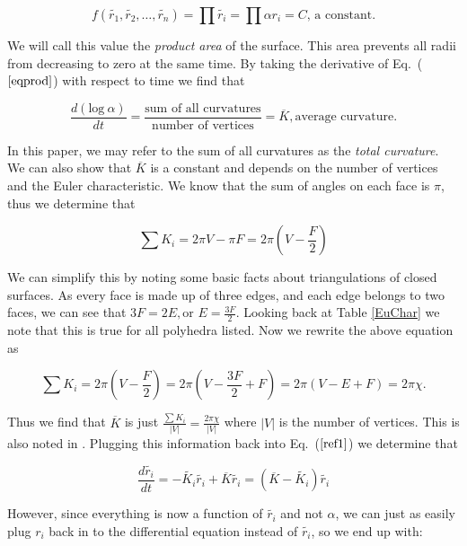 \documentclass[12pt]{article}
\begin{document}
\begin{equation}
\label{eqprod}
f(\tilde{r_1},\tilde{r_2},\ldots,\tilde{r_n}) = \prod{\tilde{r_i}} = \prod{\alpha r_i} = C\mbox{, a constant.}
\end{equation}

 We will call this value the \textit{product area} of the surface. This area prevents all radii from decreasing to zero at the same time. By taking the derivative of Eq.~($\ref{eqprod}$) with respect to time we find that 
 
\begin{equation}
\label{proof1}
\frac{d(\mbox{log}~\alpha)}{dt} = \frac{\mbox{sum of all curvatures}}{\mbox{number of vertices}} = \overline{K}, \mbox{average curvature.}
\end{equation}

 In this paper, we may refer to the sum of all curvatures as the \textit{total curvature}. We can also show that $\overline{K}$ is a constant and depends on the number of vertices and the Euler characteristic. We know that the sum of angles on each face is $\pi$, thus we determine that 

$$\sum{K_i} = 2\pi V - \pi F = 2\pi(V - \frac{F}{2})$$

 We can simplify this by noting some basic facts about triangulations of closed surfaces. As every face is made up of three edges, and each edge belongs to two faces, we can see that $3F = 2E, \mbox{or } E = \frac{3F}{2}$. Looking back at Table \ref{EuChar} we note that this is true for all polyhedra listed. Now we rewrite the above equation as

$$\sum{K_i} = 2\pi(V - \frac{F}{2}) = 2\pi(V - \frac{3F}{2} + F) = 2\pi(V - E + F) = 2\pi \chi.$$

 Thus we find that $\overline{K}$ is just $\displaystyle\frac{\sum{K_i}}{|V|} = \frac{2\pi \chi}{|V|}$ where $|V|$ is the number of vertices. This is also noted in \cite{chowluo}. Plugging this information back into Eq.~($\ref{ref1}$) we determine that

\begin{equation}
\frac{d\tilde{r_i}}{dt} = -\tilde{K_i}\tilde{r_i} + \overline{K}\tilde{r_i} = (\overline{K} - \tilde{K_i})\tilde{r_i}
\end{equation}

 However, since everything is now a function of $\tilde{r_i}$ and not $\alpha$, we can just as easily plug $r_i$ back in to the differential equation instead of $\tilde{r_i}$, so we end up with:
\end{document}
